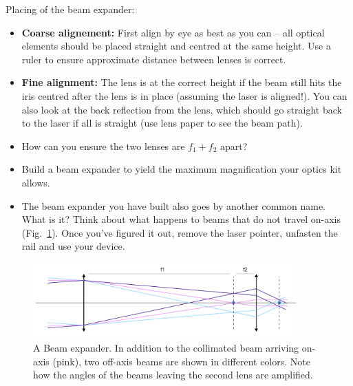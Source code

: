 \documentclass[a4paper]{report}
\begin{document}
	\noindent
	Placing of the beam expander:
	\begin{itemize}
	    \item \textbf{Coarse alignement:} First align by eye as best as you can -- all optical elements should be placed straight and centred at the same height. Use a ruler to ensure approximate distance between lenses is correct.
		\item \textbf{Fine alignment:} The lens is at the correct height if the beam still hits the iris centred after the lens is in place (assuming the laser is aligned!). You can also look at the back reflection from the lens, which should go straight back to the laser if all is straight (use lens paper to see the beam path).
		\item How can you ensure the two lenses are $f_1+f_2$ apart?
        \item Build a beam expander to yield the maximum magnification your optics kit allows.
		\item The beam expander you have built also goes by another common name.  What is it? 
		Think about what happens to beams that do not travel on-axis (Fig.~\ref{fig:telescope}). Once you've figured it out, remove the laser pointer, unfasten the rail and use your device.
	\end{itemize}


	
	\begin{figure}[h]
		\center
		\includegraphics[width=0.9\textwidth]{figures/telescope.png}
		\captionsetup{width=0.9\textwidth}
		\caption{A Beam expander. In addition to the collimated beam arriving on-axis (pink), two off-axis beams are shown in different colors. Note how the angles of the beams leaving the second lens are amplified.}
		\label{fig:telescope}
	\end{figure}
	
	\clearpage

\end{document}
